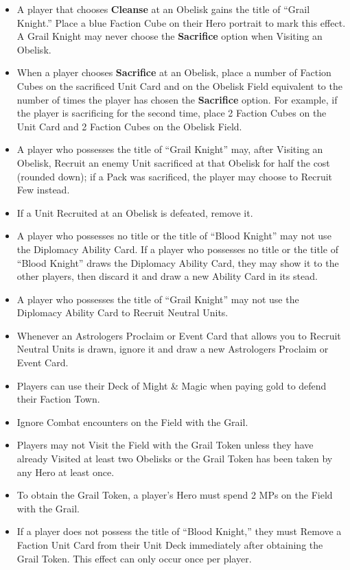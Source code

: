 \begin{multicols*}{2}
\begin{itemize}
  \item A player that chooses \textbf{Cleanse} at an Obelisk gains the title of ``\textcolor{cobalt}{Grail Knight}.'' Place a blue Faction Cube on their Hero portrait to mark this effect. A \textcolor{cobalt}{Grail Knight} may never choose the \textbf{Sacrifice} option when Visiting an Obelisk.
  \item When a player chooses \textbf{Sacrifice} at an Obelisk, place a number of Faction Cubes on the sacrificed Unit Card and on the Obelisk Field equivalent to the number of times the player has chosen the \textbf{Sacrifice} option. For example, if the player is sacrificing for the second time, place 2 Faction Cubes on the Unit Card and 2 Faction Cubes on the Obelisk Field.
  \item A player who possesses the title of ``\textcolor{cobalt}{Grail Knight}'' may, after Visiting an Obelisk, Recruit an enemy Unit sacrificed at that Obelisk for half the cost (rounded down); if a Pack was sacrificed, the player may choose to Recruit Few instead.
  \item If a Unit Recruited at an Obelisk is defeated, remove it.
  \item A player who possesses no title or the title of ``\textcolor{darkcandyapplered}{Blood Knight}'' may not use the Diplomacy Ability Card. If a player who possesses no title or the title of ``\textcolor{darkcandyapplered}{Blood Knight}'' draws the Diplomacy Ability Card, they may show it to the other players, then discard it and draw a new Ability Card in its stead.
  \item A player who possesses the title of ``\textcolor{cobalt}{Grail Knight}'' may not use the Diplomacy Ability Card to Recruit Neutral  Units.
  \item Whenever an Astrologers Proclaim or Event Card that allows you to Recruit Neutral Units is drawn, ignore it and draw a new Astrologers Proclaim or Event Card.
  \item Players can use their Deck of Might \& Magic when paying gold to defend their Faction Town.
  \item Ignore Combat encounters on the Field with the Grail.
  \item Players may not Visit the Field with the Grail Token unless they have already Visited at least two Obelisks or the Grail Token has been taken by any Hero at least once.
  \item To obtain the Grail Token, a player’s Hero must spend 2 MPs on the Field with the Grail.
  \item If a player does not possess the title of ``\textcolor{darkcandyapplered}{Blood Knight},'' they must Remove a Faction Unit Card from their Unit Deck immediately after obtaining the Grail Token. This effect can only occur once per player.

\end{itemize}
\end{multicols*}
